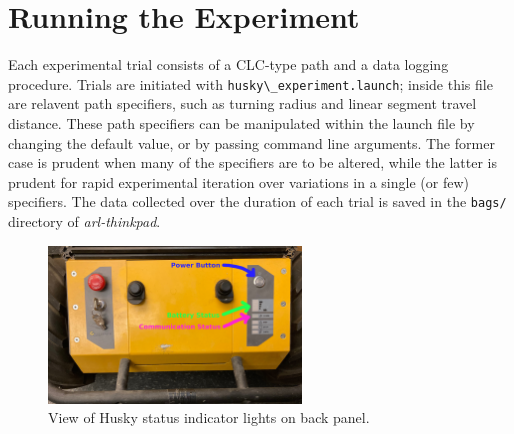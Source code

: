 \documentclass[
	12pt, %
]{fphw}
\newcommand{\code}[1]{\colorbox{light-gray}{\lstinline|#1|}}
\begin{document}

\section{Running the Experiment}

Each experimental trial consists of a CLC-type path and a data logging procedure. Trials are initiated with \code{husky\_experiment.launch}; inside this file are relavent path specifiers, such as turning radius and linear segment travel distance. These path specifiers can be manipulated within the launch file by changing the default value, or by passing command line arguments. The former case is prudent when many of the specifiers are to be altered, while the latter is prudent for rapid experimental iteration over variations in a single (or few) specifiers. The data collected over the duration of each trial is saved in the \code{bags/} directory of \emph{arl-thinkpad}.

\begin{figure}
  \centering
  \includegraphics[width=0.6\textwidth]{figs/HuskyPanel.jpg}
  \caption{View of Husky status indicator lights on back panel.}
  \label{fig:HuskyPanel}
\end{figure}
\end{document}
